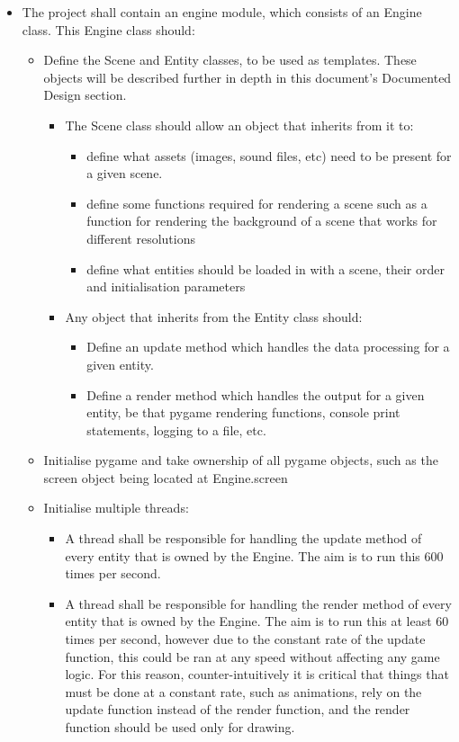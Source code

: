 \documentclass{article}
\begin{document}
\begin{itemize}
    \renewcommand\labelitemi{--}
    \item The project shall contain an engine module, which consists of an Engine class. This Engine class should:
    \begin{itemize}
        \renewcommand\labelitemi{--}
        \item Define the Scene and Entity classes, to be used as templates. These objects will be described further in depth in this document's Documented Design section.
        \begin{itemize}
            \item The Scene class should allow an object that inherits from it to:
            \begin{itemize}
                \item define what assets (images, sound files, etc) need to be present for a given scene.
                \item define some functions required for rendering a scene such as a function for rendering the background of a scene that works for different resolutions
                \item define what entities should be loaded in with a scene, their order and initialisation parameters
            \end{itemize} 
            \item Any object that inherits from the Entity class should:
            \begin{itemize}
                \item Define an update method which handles the data processing for a given entity.
                \item Define a render method which handles the output for a given entity, be that pygame rendering functions, console print statements, logging to a file, etc.
            \end{itemize}
        \end{itemize}
        \item Initialise pygame and take ownership of all pygame objects, such as the screen object being located at Engine.screen
        \item Initialise multiple threads:
            \begin{itemize}
                \item A thread shall be responsible for handling the update method of every entity that is owned by the Engine. The aim is to run this 600 times per second.
                \item A thread shall be responsible for handling the render method of every entity that is owned by the Engine. The aim is to run this at least 60 times per second, however due to the constant rate of the update function, this could be ran at any speed without affecting any game logic. For this reason, counter-intuitively it is critical that things that must be done at a constant rate, such as animations, rely on the update function instead of the render function, and the render function should be used only for drawing.

\end{itemize}
\end{itemize}
\end{itemize}
\end{document}
